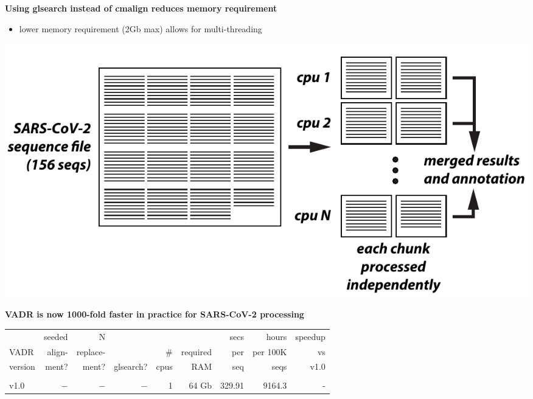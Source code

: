 \documentclass[landscape]{slides}
\begin{document}
\begin{slide}
\begin{center}
\textbf{Using glsearch instead of cmalign reduces memory requirement}
\end{center}

\begin{itemize}
\item lower memory requirement (2Gb max) allows for multi-threading
\end{itemize}

\begin{center}
\includegraphics[width=10.5in]{figs/vadr-1p2-multithreading}
\end{center}
  
\vfill
\end{slide}
\begin{slide}
\begin{center}
\normalsize{\textbf{VADR is now 1000-fold faster in practice for SARS-CoV-2 processing}}

\scriptsize
\begin{tabular}{lrrrrrrrr}
            &seeded      &N           &            &            &            &secs        &hours       &speedup     \\ 
VADR        &align-      &replace-    &            &\#          &required    &per         &per 100K    &vs          \\ 
version     &ment?       &ment?       &glsearch?   &cpus        &RAM         &seq         &seqs        &v1.0        \\ 
\hline
& & & & & & & & \\
v1.0        &$-$         &$-$         &$-$         &1           &64 Gb       &329.91      &9164.3      &-           \\
\end{tabular}
\end{center}

\vfill
\end{slide}
\end{document}
